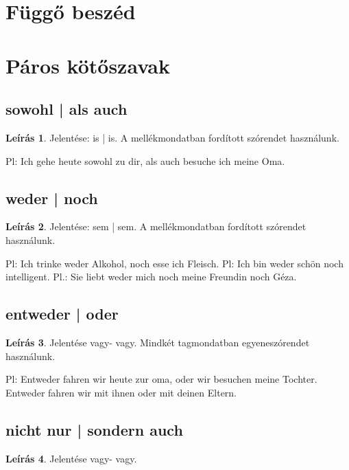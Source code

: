 \documentclass{article}
\theoremstyle{definition}
\newtheorem*{desc}{Leírás}
\begin{document}
\section{Függő beszéd}

\section{Páros kötőszavak}

\subsection{sowohl | als auch}

\begin{desc}
Jelentése: is | is. A mellékmondatban fordított szórendet használunk.

Pl: Ich gehe heute sowohl zu dir, als auch besuche ich meine Oma. 
\end{desc}

\subsection{weder | noch}

\begin{desc}
Jelentése: sem | sem. A mellékmondatban fordított szórendet használunk.

Pl: Ich trinke weder Alkohol, noch esse ich Fleisch.
Pl: Ich bin weder schön noch intelligent.
Pl.: Sie liebt weder mich noch meine Freundin noch Géza.
\end{desc}

\subsection{entweder | oder}

\begin{desc}
Jelentése vagy- vagy. Mindkét tagmondatban egyeneszórendet használunk.

Pl: Entweder fahren wir heute zur oma, oder wir besuchen meine Tochter.
Entweder fahren wir mit ihnen oder mit deinen Eltern.
\end{desc}

\subsection{nicht nur | sondern auch}

\begin{desc}
Jelentése vagy- vagy.
\end{desc}
\end{document}
